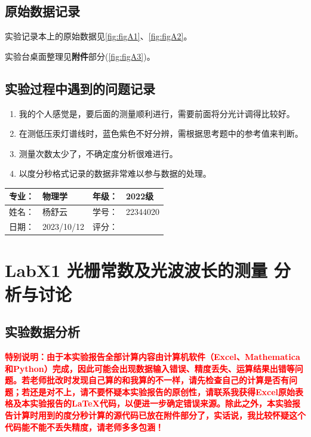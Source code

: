 \documentclass[dvipsnames, svgnames,a4paper,11pt]{article}
\begin{document}
	\clearpage
	\subsection{原始数据记录}
	实验记录本上的原始数据见\cref{fig:figA1}、\cref{fig:figA2}。
	
	实验台桌面整理见\textbf{附件}部分(\cref{fig:figA3})。
	
	\subsection{实验过程中遇到的问题记录}
	\begin{enumerate}
		\item 我的个人感觉是，要后面的测量顺利进行，需要前面将分光计调得比较好。
		\item 在测低压汞灯谱线时，蓝色紫色不好分辨，需根据思考题中的参考值来判断。
		\item 测量次数太少了，不确定度分析很难进行。
		\item 以度分秒格式记录的数据非常难以参与数据的处理。
	\end{enumerate}
	
	
	
	\clearpage
	\begin{table}
		\renewcommand\arraystretch{1.7}
		\begin{tabularx}{\textwidth}{|X|X|X|X|}
			\hline
			专业：& 物理学 &年级：& 2022级\\
			\hline
			姓名： & 杨舒云 & 学号：& 22344020\\
			\hline
			日期：& 2023/10/12 & 评分： &\\
			\hline
		\end{tabularx}
	\end{table}
	
	\section{LabX1 光栅常数及光波波长的测量 \quad\heiti 分析与讨论}
	\subsection{实验数据分析}
	\textcolor{red}{\textbf{特别说明：由于本实验报告全部计算内容由计算机软件（Excel、Mathematica和Python）完成，因此可能会出现数据输入错误、精度丢失、运算结果出错等问题。若老师批改时发现自己算的和我算的不一样，请先检查自己的计算是否有问题；若还是对不上，请不要怀疑本实验报告的原创性，请联系我获得Excel原始表格及本实验报告的\LaTeX 代码，以便进一步确定错误来源。除此之外，本实验报告计算时用到的度分秒计算的源代码已放在附件部分了，实话说，我比较怀疑这个代码能不能不丢失精度，请老师多多包涵！}}
\end{document}
